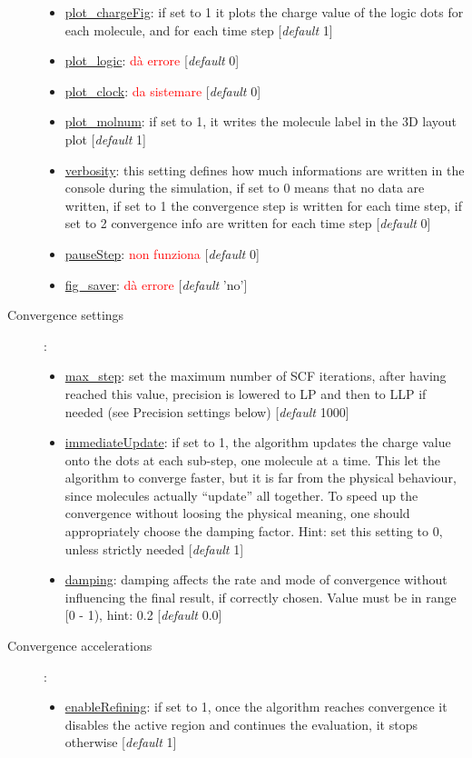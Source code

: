 \documentclass[a4paper,10pt]{article}
\begin{document}
\begin{description}
\begin{itemize}
	\item \underline{plot\_chargeFig}: if set to 1 it plots the charge value of the logic dots for each molecule, and for each time step [\textit{default} 1] 
	\item \underline{plot\_logic}: \textcolor{red}{dà errore} [\textit{default} 0] 
	\item \underline{plot\_clock}: \textcolor{red}{da sistemare} [\textit{default} 0]
	\item \underline{plot\_molnum}: if set to 1, it writes the molecule label in the 3D layout plot [\textit{default} 1] 
	\item \underline{verbosity}: this setting defines how much informations are written in the console during the simulation, if set to 0 means that no data are written, if set to 1 the convergence step is written for each time step, if set to 2 convergence info are written for each time step [\textit{default} 0] 
	\item \underline{pauseStep}: \textcolor{red}{non funziona} [\textit{default} 0] 
	\item \underline{fig\_saver}: \textcolor{red}{dà errore} [\textit{default} 'no'] 
	\end{itemize}
\item[Convergence settings]:
	\begin{itemize}
	\item \underline{max\_step}: set the maximum number of SCF iterations, after having reached this value, precision is lowered to LP and then to LLP if needed (see Precision settings below) [\textit{default} 1000] 
	\item \underline{immediateUpdate}: if set to 1, the algorithm updates the charge value onto the dots at each sub-step, one molecule at a time. This let the algorithm to converge faster, but it is far from the physical behaviour, since molecules actually \enquote{update} all together. To speed up the convergence without loosing the physical meaning, one should appropriately choose the damping factor. Hint: set this setting to 0, unless strictly needed [\textit{default} 1] 
	\item \underline{damping}: damping affects the rate and mode of convergence without influencing the final result, if correctly chosen. Value must be in range [0 - 1), hint: 0.2 [\textit{default} 0.0] 
	\end{itemize}
\item[Convergence accelerations]:
	\begin{itemize}
	\item \underline{enableRefining}: if set to 1, once the algorithm reaches convergence it disables the active region and continues the evaluation, it stops otherwise [\textit{default} 1] 

\end{itemize}
\end{description}
\end{document}
